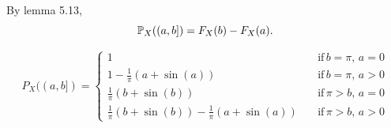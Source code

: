 
By lemma 5.13, 
\[
    \P_{X} ((a,b]) = F_{X} (b) - F_{X} (a)    
.\] 

\begin{equation*}
    P_{X} ((a,b]) = 
    \begin{cases}
	1 & \mbox{if} \, b=\pi, \, a = 0\\
	1- \frac{1}{\pi} (a + \sin(a)) & \mbox{if} \, b = \pi, \, a > 0\\
	\frac{1}{\pi} (b + \sin(b)) & \mbox{if} \, \pi > b, \, a = 0\\
	\frac{1}{\pi} (b + \sin(b)) - \frac{1}{\pi} (a + \sin(a)) \quad & \mbox{if} \, \pi>b, \, a>0
    \end{cases}
\end{equation*}


